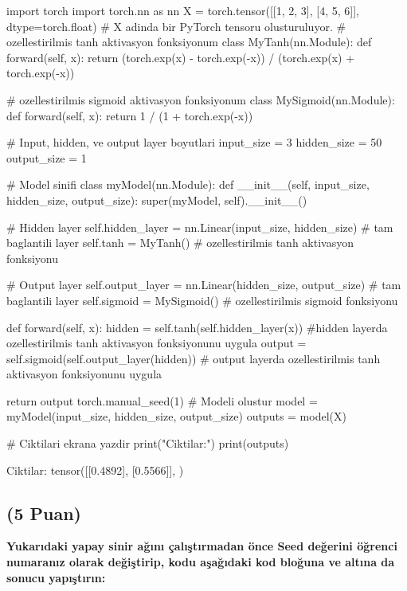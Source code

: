 \documentclass[11pt]{article}
\begin{document}
\begin{python}
import torch
import torch.nn as nn
X = torch.tensor([[1, 2, 3], [4, 5, 6]], dtype=torch.float) # X adinda bir PyTorch tensoru olusturuluyor.
# ozellestirilmis  tanh aktivasyon fonksiyonum
class MyTanh(nn.Module):
    def forward(self, x):
        return (torch.exp(x) - torch.exp(-x)) / (torch.exp(x) + torch.exp(-x))

# ozellestirilmis sigmoid aktivasyon fonksiyonum
class MySigmoid(nn.Module):
    def forward(self, x):
        return 1 / (1 + torch.exp(-x))

# Input, hidden, ve output layer boyutlari
input_size = 3
hidden_size = 50
output_size = 1

# Model sinifi
class myModel(nn.Module):
    def __init__(self, input_size, hidden_size, output_size):
        super(myModel, self).__init__()

        # Hidden layer
        self.hidden_layer = nn.Linear(input_size, hidden_size) # tam baglantili layer
        self.tanh = MyTanh() # ozellestirilmis tanh aktivasyon fonksiyonu

        # Output layer
        self.output_layer = nn.Linear(hidden_size, output_size) # tam baglantili layer
        self.sigmoid = MySigmoid() # ozellestirilmis sigmoid fonksiyonu

    def forward(self, x):
        hidden = self.tanh(self.hidden_layer(x)) #hidden layerda  ozellestirilmis tanh aktivasyon fonksiyonunu uygula
        output = self.sigmoid(self.output_layer(hidden)) # output layerda  ozellestirilmis tanh aktivasyon fonksiyonunu uygula
        
        return output
torch.manual_seed(1)
# Modeli olustur
model = myModel(input_size, hidden_size, output_size)
outputs = model(X)

# Ciktilari ekrana yazdir
print("Ciktilar:")
print(outputs)

\end{python}

Ciktilar:
tensor([[0.4892],
        [0.5566]], )

\subsection{(5 Puan)} \textbf{Yukarıdaki yapay sinir ağını çalıştırmadan önce Seed değerini öğrenci numaranız olarak değiştirip, kodu aşağıdaki kod bloğuna ve altına da sonucu yapıştırın:}
\end{document}

